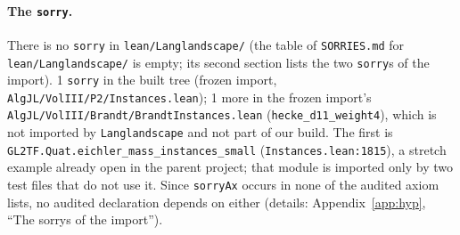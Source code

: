 \paragraph{The \texttt{sorry}.} There is no \texttt{sorry} in \texttt{lean/Langlandscape/} (the table of
\texttt{SORRIES.md} for \texttt{lean/Langlandscape/} is empty; its second section lists the two \texttt{sorry}s of the import).
1 \texttt{sorry} in the built tree (frozen import, \texttt{AlgJL/VolIII/P2/Instances.lean}); 1 more in the frozen import's
\texttt{AlgJL/VolIII/Brandt/BrandtInstances.lean} (\texttt{hecke\_d11\_weight4}), which is not imported by
\texttt{Langlandscape} and not part of our build. The first is \texttt{GL2TF.Quat.eichler\_mass\_instances\_small}
(\texttt{Instances.lean:1815}), a stretch example already open in the parent project; that module is imported only by two
test files that do not use it. Since \texttt{sorryAx} occurs in none of the \GateAudited{}
audited axiom lists, no audited declaration depends on either (details: Appendix~\ref{app:hyp}, ``The sorrys of the import'').

